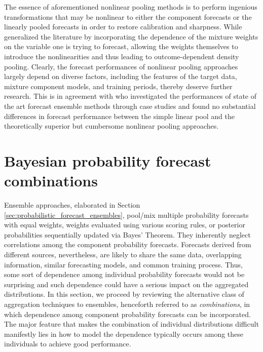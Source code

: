 \documentclass[11pt]{article}
\begin{document}
The essence of aforementioned nonlinear pooling methods is to perform ingenious transformations that may be nonlinear to either the component forecasts or the linearly pooled forecasts in order to restore calibration and sharpness. While \cite{Kapetanios2015-bb} generalized the literature by incorporating the dependence of the mixture weights on the variable one is trying to forecast, allowing the weights themselves to introduce the nonlinearities and thus leading to outcome-dependent density pooling. Clearly, the forecast performances of nonlinear pooling approaches largely depend on diverse factors, including the features of the target data, mixture component models, and training periods, thereby deserve further research. This is in agreement with \cite{Baran2018-nm} who investigated the performances of state of the art forecast ensemble methods through case studies and found no substantial differences in forecast performance between the simple linear pool and the theoretically superior but cumbersome nonlinear pooling approaches.

\section{Bayesian probability forecast combinations}
\label{sec:probability_forecast_combinations}


Ensemble approaches, elaborated in Section \ref{sec:probabilistic_forecast_ensembles}, pool/mix multiple probability forecasts with equal weights, weights evaluated using various scoring rules, or posterior probabilities sequentially updated via Bayes' Theorem. They inherently neglect correlations among the component probability forecasts. Forecasts derived from different sources, nevertheless, are likely to share the same data, overlapping information, similar forecasting models, and common training process. Thus, some sort of dependence among individual probability forecasts would not be surprising and such dependence could have a serious impact on the aggregated distributions. In this section, we proceed by reviewing the alternative class of aggregation techniques to ensembles, henceforth referred to as \textit{combinations}, in which dependence among component probability forecasts can be incorporated. The major feature that makes the combination of individual distributions difficult manifestly lies in how to model the dependence typically occurs among these individuals to achieve good performance.
\end{document}

